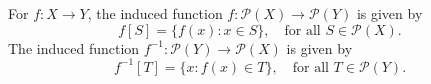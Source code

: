 For $f: X \rightarrow Y$, the induced function $f: \mathcal{P}(X) \rightarrow \mathcal{P}(Y)$ is given by
$$f[S] = \{f(x): x \in S\}, \quad \text{for all } S \in \mathcal{P}(X).$$
The induced function $f^{-1}: \mathcal{P}(Y) \rightarrow \mathcal{P}(X)$ is given by
$$f^{-1}[T] = \{x: f(x) \in T\}, \quad \text{for all } T \in \mathcal{P}(Y).$$
